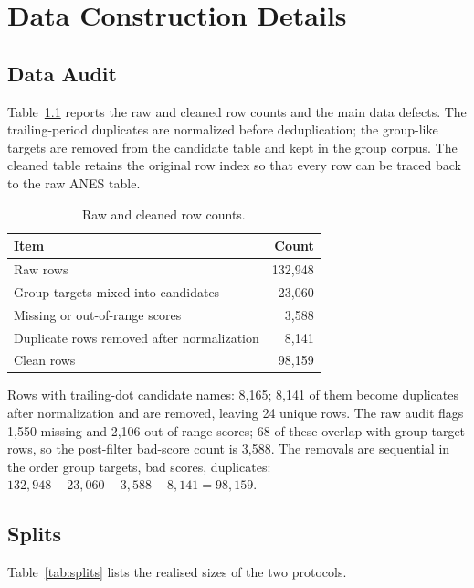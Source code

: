 \chapter{Data Construction Details}
\label{app:data}

\section{Data Audit}

Table~\ref{tab:audit_full} reports the raw and cleaned row counts and the main
data defects. The trailing-period duplicates are normalized before deduplication;
the group-like targets are removed from the candidate table and kept in the group
corpus. The cleaned table retains the original row index so that every row can be
traced back to the raw ANES table.

\begin{table}[h]
\centering
\small
\caption{Raw and cleaned row counts.}
\label{tab:audit_full}
\begin{tabular}{lr}
\toprule
Item & Count \\
\midrule
Raw rows & 132,948 \\
Group targets mixed into candidates & 23,060 \\
Missing or out-of-range scores & 3,588 \\
Duplicate rows removed after normalization & 8,141 \\
Clean rows & 98,159 \\
\bottomrule
\end{tabular}
\par\smallskip\footnotesize
Rows with trailing-dot candidate names: 8,165; 8,141 of them become duplicates
after normalization and are removed, leaving 24 unique rows. The raw audit flags
1,550 missing and 2,106 out-of-range scores; 68 of these overlap with
group-target rows, so the post-filter bad-score count is 3,588. The removals are
sequential in the order group targets, bad scores, duplicates:
$132{,}948 - 23{,}060 - 3{,}588 - 8{,}141 = 98{,}159$.
\end{table}

\section{Splits}

Table~\ref{tab:splits} lists the realised sizes of the two protocols.

